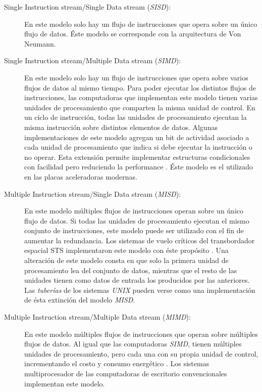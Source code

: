 \begin{description}

	\item[Single Instruction stream/Single Data stream (\emph{SISD}):] En
		este modelo solo hay un flujo de instrucciones que opera sobre
		un único flujo de datos. Éste modelo se corresponde con la
		arquitectura de Von Neumann.

	\item[Single Instruction stream/Multiple Data stream (\emph{SIMD}):] En
		este modelo solo hay un flujo de instrucciones que opera sobre
		varios flujos de datos al mismo tiempo. Para poder ejecutar los
		distintos flujos de instrucciones, las computadoras que
		implementan este modelo tienen varias unidades de procesamiento
		que comparten la misma unidad de control. En un ciclo de
		instrucción, todas las unidades de procesamiento ejecutan la
		misma instrucción sobre distintos elementos de datos. Algunas
		implementaciones de este modelo agregan un bit de actividad
		asociado a cada unidad de procesamiento que indica si debe
		ejecutar la instrucción o no operar. Esta extensión permite
		implementar estructuras condicionales con facilidad pero
		reduciendo la performance \cite{introToPC2002}. Éste modelo es
		el utilizado en las placas aceleradoras modernas.

	\item[Multiple Instruction stream/Single Data stream (\emph{MISD}):] En
		este modelo múltiples flujos de instrucciones operan sobre un
		único flujo de datos. Si todas las unidades de procesamiento
		ejecutan el mismo conjunto de instrucciones, este modelo puede
		ser utilizado con el fin de aumentar la redundancia. Los
		sistemas de vuelo críticos del transbordador espacial STS
		implementaron este modelo con éste propósito
		\cite{spaceShuttlePCS1984}. Una alteración de este modelo consta
		en que solo la primera unidad de procesamiento lea del conjunto
		de datos, mientras que el resto de las unidades tienen como
		datos de entrada los producidos por las anteriores. Las
		\emph{tuberías} de los sistemas \emph{UNIX} pueden verse como
		una implementación de ésta extinción del modelo \emph{MISD}.

	\item[Multiple Instruction stream/Multiple Data stream (\emph{MIMD}):] En
		este modelo múltiples flujos de instrucciones que operan sobre
		múltiples flujos de datos. Al igual que las computadoras
		\emph{SIMD}, tienen múltiples unidades de procesamiento, pero
		cada una con su propia unidad de control, incrementando el costo
		y consumo energético \cite{introToPC2002}. Los sistemas
		multiprocesador de las computadoras de escritorio convencionales
		implementan este modelo.

\end{description}


